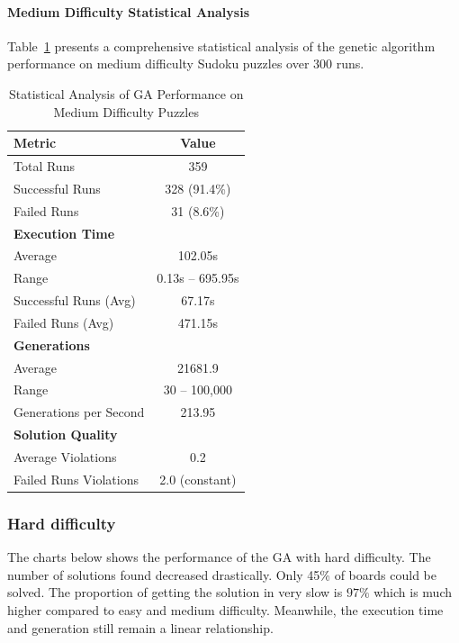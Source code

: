 \paragraph{Medium Difficulty Statistical Analysis}

Table~\ref{tab:medium_difficulty_stats} presents a comprehensive statistical analysis of the genetic algorithm performance on medium difficulty Sudoku puzzles over 300 runs.

\begin{table}[H]
\centering
\caption{Statistical Analysis of GA Performance on Medium Difficulty Puzzles}
\label{tab:medium_difficulty_stats}
\begin{tabular}{@{}lc@{}}
\toprule
\textbf{Metric} & \textbf{Value} \\
\midrule
Total Runs & 359 \\
Successful Runs & 328 (91.4\%) \\
Failed Runs & 31 (8.6\%) \\
\midrule
\textbf{Execution Time} & \\
Average & 102.05s \\
Range & 0.13s -- 695.95s \\
Successful Runs (Avg) & 67.17s \\
Failed Runs (Avg) & 471.15s \\
\midrule
\textbf{Generations} & \\
Average & 21681.9 \\
Range & 30 -- 100,000 \\
Generations per Second & 213.95 \\
\midrule
\textbf{Solution Quality} & \\
Average Violations & 0.2 \\
Failed Runs Violations & 2.0 (constant) \\
\bottomrule
\end{tabular}
\end{table}

\subsubsection{Hard difficulty}

The charts below shows the performance of the GA with hard difficulty. The number of solutions found decreased drastically. Only 45\% of boards could be solved. The proportion of getting the solution in very slow is $97\%$ which is much higher compared to easy and medium difficulty.
Meanwhile, the execution time and generation still remain a linear relationship.

